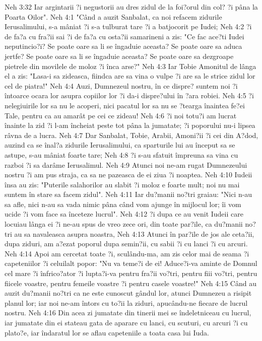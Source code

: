 Neh 3:32  Iar argintarii ?i negustorii au dres zidul de la foi?orul din col? ?i pâna la Poarta Oilor".
Neh 4:1  "Când a auzit Sanbalat, ca noi refacem zidurile Ierusalimului, s-a mâniat ?i s-a tulburat tare ?i a batjocorit pe Iudei;
Neh 4:2  ?i de fa?a cu fra?ii sai ?i de fa?a cu osta?ii samarineni a zis: "Ce fac ace?ti Iudei neputincio?i? Se poate oare sa li se îngaduie aceasta? Se poate oare sa aduca jertfe? Se poate oare sa li se îngaduie aceasta? Se poate oare sa dezgroape pietrele din movilele de moloz ?i înca arse?"
Neh 4:3  Iar Tobie Amonitul de lânga el a zis: "Lasa-i sa zideasca, fiindca are sa vina o vulpe ?i are sa le strice zidul lor cel de piatra!"
Neh 4:4  Auzi, Dumnezeul nostru, în ce dispre? suntem noi ?i întoarce ocara lor asupra copiilor lor ?i da-i dispre?ului în ?ara robiei.
Neh 4:5  ?i nelegiuirile lor sa nu le acoperi, nici pacatul lor sa nu se ?tearga înaintea fe?ei Tale, pentru ca au amarât pe cei ce zideau!
Neh 4:6  ?i noi totu?i am lucrat înainte la zid ?i l-am încheiat peste tot pâna la jumatate; ?i poporului nu-i lipsea râvna de a lucra.
Neh 4:7  Dar Sanbalat, Tobie, Arabii, Amoni?ii ?i cei din A?dod, auzind ca se înal?a zidurile Ierusalimului, ca sparturile lui au început sa se astupe, s-au mâniat foarte tare;
Neh 4:8  ?i s-au sfatuit împreuna sa vina cu razboi ?i sa darâme Ierusalimul.
Neh 4:9  Atunci noi ne-am rugat Dumnezeului nostru ?i am pus straja, ca sa ne pazeasca de ei ziua ?i noaptea.
Neh 4:10  Iudeii însa au zis: "Puterile salahorilor au slabit ?i moloz e foarte mult; noi nu mai suntem în stare sa facem zidul".
Neh 4:11  Iar du?manii no?tri graiau: "Nici n-au sa afle, nici n-au sa vada nimic pâna când vom ajunge în mijlocul lor; îi vom ucide ?i vom face sa înceteze lucrul".
Neh 4:12  ?i dupa ce au venit Iudeii care locuiau lânga ei ?i ne-au spus de vreo zece ori, din toate par?ile, ca du?manii no?tri au sa navaleasca asupra noastra,
Neh 4:13  Atunci în par?ile de jos ale ceta?ii, dupa ziduri, am a?ezat poporul dupa semin?ii, cu sabii ?i cu lanci ?i cu arcuri.
Neh 4:14  Apoi am cercetat toate ?i, sculându-ma, am zis celor mai de seama ?i capeteniilor ?i celuilalt popor: "Nu va teme?i de ei! Aduce?i-va aminte de Domnul cel mare ?i înfrico?ator ?i lupta?i-va pentru fra?ii vo?tri, pentru fiii vo?tri, pentru fiicele voastre, pentru femeile voastre ?i pentru casele voastre!"
Neh 4:15  Când au auzit du?manii no?tri ca ne este cunoscut gândul lor, atunci Dumnezeu a risipit planul lor; iar noi ne-am întors cu to?ii la ziduri, apucându-ne fiecare de lucrul nostru.
Neh 4:16  Din acea zi jumatate din tinerii mei se îndeletniceau cu lucrul, iar jumatate din ei stateau gata de aparare cu lanci, cu scuturi, cu arcuri ?i cu plato?e, iar îndaratul lor se aflau capeteniile a toata casa lui Iuda.

